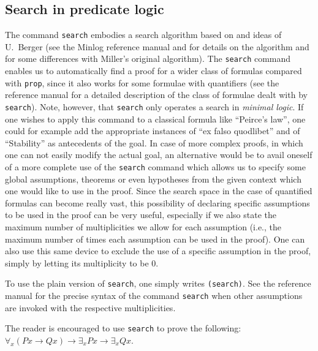 \documentclass[12pt]{amsart}
\newcommand{\inquotes}[1]{``#1''}
\begin{document}
\subsection{Search in predicate logic}
The command \texttt{search} embodies a search algorithm based on
\cite{Miller91b} and ideas of U.~Berger (see the Minlog reference
manual and \cite{Schwichtenberg04} for details on the algorithm and
for some differences with Miller's original algorithm).  The
\texttt{search} command enables us to automatically find a proof for a
wider class of formulas compared with \texttt{prop}, since it also
works for some formulae with quantifiers (see the reference manual for
a detailed description of the class of formulae dealt with by
\texttt{search}).  Note, however, that \texttt{search} only operates a
search in \emph{minimal logic}.  If one wishes to apply this command
to a classical formula like \inquotes{Peirce's law}, one could for
example add the appropriate instances of \inquotes{ex falso quodlibet}
and of \inquotes{Stability} as antecedents of the goal.  In case of
more complex proofs, in which one can not easily modify the actual
goal, an alternative would be to avail oneself of a more complete use
of the \texttt{search} command which allows us to specify some global
assumptions, theorems or even hypotheses from the given context which
one would like to use in the proof.  Since the search space in the
case of quantified formulas can become really vast, this possibility
of declaring specific assumptions to be used in the proof can be very
useful, especially if we also state the maximum number of
multiplicities we allow for each assumption (i.e., the maximum number
of times each assumption can be used in the proof).  One can also use
this same device to exclude the use of a specific assumption in the
proof, simply by letting its multiplicity to be $0$.

To use the plain version of \texttt{search}, one simply writes
\texttt{(search)}.  See the reference manual for the precise syntax of
the command \texttt{search} when other assumptions are invoked with
the respective multiplicities.

The reader is encouraged to use \texttt{search} to prove the
following: $\forall_x (P x \to Q x) \to \exists_x P x \to \exists_x Q
x$.
\end{document}
